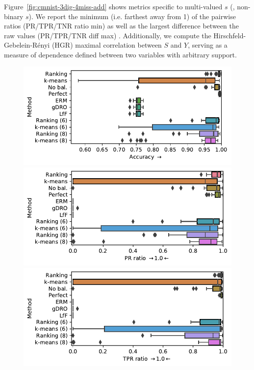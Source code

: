 Figure~\ref{fig:cmnist-3dig-4miss-add} shows metrics specific to multi-valued $s$ (\ie, non-binary $s$).
We report the minimum (i.e. farthest away from 1) of the pairwise ratios (PR/TPR/TNR ratio min) as well as the largest difference between the raw values (PR/TPR/TNR diff max) . 
Additionally, we compute the Hirschfeld-Gebelein-R\'enyi (HGR) maximal correlation \citep{renyi1959measures} between $S$ and $Y$, serving as a measure of dependence defined between two variables with arbitrary support.
\begin{figure}[htp]
  \centering
  \includegraphics[width=0.8\columnwidth]{paper3/figures/cmnist_2v4_partial_overcluster_acc.pdf}
  \includegraphics[width=0.8\columnwidth]{paper3/figures/cmnist_2v4_partial_overcluster_prr.pdf}
  \includegraphics[width=0.8\columnwidth]{paper3/figures/cmnist_2v4_partial_overcluster_tprr.pdf}

\end{figure}
